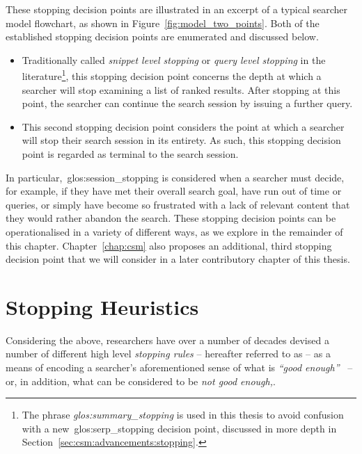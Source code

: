 These stopping decision points are illustrated in an excerpt of a typical searcher model flowchart, as shown in Figure~\ref{fig:model_two_points}. Both of the established stopping decision points are enumerated and discussed below.

\vspace*{-4mm}
\begin{itemize}
    \item[\blueboxbold{1}]{ Traditionally called \emph{snippet level stopping} or \emph{query level stopping} in the literature\footnote{The phrase \emph{\gls{glos:summary_stopping}} is used in this thesis to avoid confusion with a new~\gls{glos:serp_stopping} decision point, discussed in more depth in Section~\ref{sec:csm:advancements:stopping}.}, this stopping decision point concerns the depth at which a searcher will stop examining a list of ranked results. After stopping at this point, the searcher can continue the search session by issuing a further query.}
    \item[\blueboxbold{2}]{ This second stopping decision point considers the point at which a searcher will stop their search session in its entirety. As such, this stopping decision point is regarded as terminal to the search session.}
\end{itemize}
\vspace*{-4mm}

In particular,~\gls{glos:session_stopping} is considered when a searcher must decide, for example, if they have met their overall search goal, have run out of time or queries, or simply have become so frustrated with a lack of relevant content that they would rather abandon the search. These stopping decision points can be operationalised in a variety of different ways, as we explore in the remainder of this chapter. Chapter~\ref{chap:csm} also proposes an additional, third stopping decision point that we will consider in a later contributory chapter of this thesis.

\section{Stopping Heuristics}\label{sec:stopping_background:heuristics}
Considering the above, researchers have over a number of decades devised a number of different high level \emph{stopping rules} -- hereafter referred to as  -- as a means of encoding a searcher's aforementioned sense of what is \emph{``good enough''}~\citep{zach2005enough_is_enough} -- or, in addition, what can be considered to be \emph{not good enough,}.

